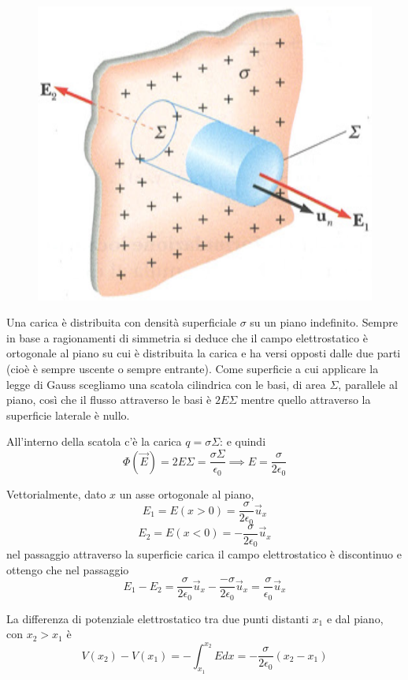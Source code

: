 \documentclass[class=book, crop=false, oneside, 12pt]{standalone}
\begin{document}
\begin{figure}[h]
    \includegraphics[scale=0.4]{campo_piano_indefinito.png}
    \centering
    \caption{}
\end{figure}

Una carica è distribuita con densità superficiale \(\sigma\) su un piano indefinito.  
Sempre in base a ragionamenti di simmetria si deduce che il campo elettrostatico è ortogonale al piano su cui è distribuita la carica e ha versi opposti dalle due parti (cioè è sempre uscente o sempre entrante).
Come superficie a cui applicare la legge di Gauss scegliamo una scatola cilindrica con le basi, di area \(\Sigma\), parallele al piano, così che il flusso attraverso le basi è \(2 E \Sigma\) mentre quello attraverso la superficie laterale è nullo.

All'interno della scatola c'è la carica \(q = \sigma \Sigma\): e quindi
\begin{equation*}
    \Phi(\overrightarrow{E}) = 2 E \Sigma = \frac{\sigma \Sigma}{\epsilon_0} \implies E = \frac{\sigma}{2 \epsilon_0}
\end{equation*}

Vettorialmente, dato \(x\) un asse ortogonale al piano,
\begin{equation*}
    E_1 = E(x > 0 ) = \frac{\sigma}{2 \epsilon_0} \overrightarrow{u}_x
\end{equation*}
\begin{equation*}
    E_2 = E(x < 0 ) = - \frac{\sigma}{2 \epsilon_0} \overrightarrow{u}_x
\end{equation*}
nel passaggio attraverso la superficie carica il campo elettrostatico è discontinuo e ottengo che nel passaggio
\begin{equation*}
    E_1 - E_2 = \frac{\sigma}{2 \epsilon_0} \overrightarrow{u}_x - \frac{- \sigma}{2 \epsilon_0} \overrightarrow{u}_x = \frac{\sigma}{\epsilon_0} \overrightarrow{u}_x
\end{equation*}

La differenza di potenziale elettrostatico tra due punti distanti \(x_1\) e dal piano, con \(x_2 > x_1\) è 
\begin{equation*}
    V(x_2) - V(x_1) = - \int_{x_1}^{x_2} E dx = - \frac{\sigma}{2 \epsilon_0} (x_2 - x_1)
\end{equation*}
\end{document}

